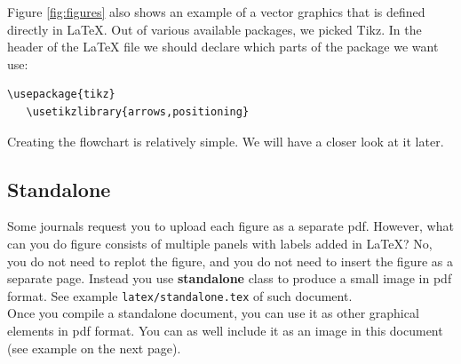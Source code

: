 \documentclass[a4paper,10pt]{report} %
\begin{document}
 Figure  \ref{fig:figures} also shows an example of a vector graphics that is defined directly in LaTeX. Out of various available packages, we picked Tikz. In the header of the LaTeX file we should declare which parts of the package we want use:
  
 \begin{lstlisting}[language={[latex]tex}, frame=single,basicstyle=\footnotesize]
   \usepackage{tikz} 
   \usetikzlibrary{arrows,positioning}
 \end{lstlisting}
 
 Creating the flowchart is relatively simple. We will have a closer look at it later.
   
 
 \subsection{Standalone}
 Some journals request you to upload each figure as a separate pdf. However, what can you do figure consists of multiple panels with labels added in LaTeX? No, you do not need to replot the figure, and you do not need to insert the figure as a separate page. Instead you use \textbf{standalone} class to produce a small image in pdf format. See example \texttt{latex/standalone.tex} of such document.\\
 
 Once you compile a standalone document, you can use it as other graphical elements in pdf format. You can as well include it as an image in this document (see example on the next page).
  
\end{document}

